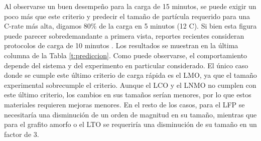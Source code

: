 \begin{table}[h!]
    \centering
    \caption{Tamaño experimental y valores predichos para cargar el 80\% del
    electrodo en 15 y 5 minutos.} 
    \setlength\extrarowheight{2pt}
    \label{t:prediccion}
\end{table}

Al observarse un buen desempeño para la carga de 15 minutos, se puede exigir un 
poco más que este criterio y predecir el tamaño de partícula requerido para una
C-rate más alta, digamos 80\% de la carga en 5 minutos (12 C). Si bien esta figura
puede parecer sobredemandante a primera vista, reportes recientes consideran 
protocolos de carga de 10 minutos \cite{mattis2021, attia2020}. Los resultados
se muestran en la última columna de la Tabla \ref{t:prediccion}. Como puede 
observarse, el comportamiento depende del sistema y del experimento en particular
considerado. El único caso donde se cumple este último criterio de carga rápida 
es el LMO, ya que el tamaño experimental sobrecumple el criterio. Aunque el LCO 
y el LNMO no cumplen con este último criterio, los cambios en sus tamaños serían
menores, por lo que estos materiales requieren mejoras menores. En el resto de 
los casos, para el LFP se necesitaría una disminución de un orden de magnitud 
en su tamaño, mientras que para el grafito amorfo o el LTO se requeriría una
disminución de su tamaño en un factor de 3.
